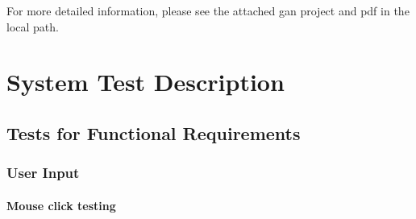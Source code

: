 \documentclass[12pt, titlepage]{article}
\begin{document}
For more detailed information, please see the attached gan project and pdf in the local path.
\section{System Test Description}
	
\subsection{Tests for Functional Requirements}

\subsubsection{User Input}
		
\paragraph{Mouse click testing}
\end{document}
